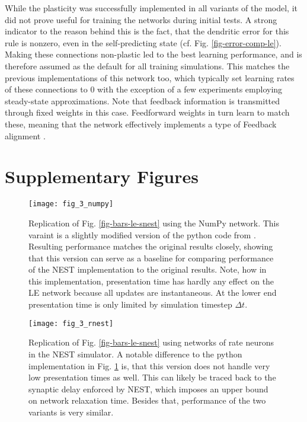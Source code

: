 While the plasticity was successfully implemented in all variants of the model, it did not prove useful for training the
networks during initial tests. A strong indicator to the reason behind this is the fact, that the dendritic error for
this rule is nonzero, even in the self-predicting state (cf. Fig. \ref{fig-error-comp-le}). Making these connections
non-plastic led to the best learning performance, and is therefore assumed as the default for all training simulations.
This matches the previous implementations of this network too, which typically set learning rates of these connections
to $0$ with the exception of a few experiments employing steady-state approximations. Note that feedback information is
transmitted through fixed weights in this case. Feedforward weights in turn learn to match these, meaning that the
network effectively implements a type of Feedback alignment \citep{Lillicrap2014}.

\newpage
\section{Supplementary Figures}


\renewcommand{\thefigure}{S\arabic{figure}}
\begin{figure}[h!]
  \centering
  \texttt{[image: fig\_3\_numpy]}
  \caption[Replication of Fig. \ref{fig-bars-le-snest} using the NumPy network]{Replication of Fig.
    \ref{fig-bars-le-snest} using the NumPy network. This varaint is a slightly modified version of the python code from
    \citep{Haider2021}. Resulting performance matches the original results closely, showing that this version can serve
    as a baseline for comparing performance of the NEST implementation to the original results. Note, how in this
    implementation, presentation time has hardly any effect on the LE network because all updates are instantaneous. At
    the lower end presentation time is only limited by simulation timestep $\Delta t$.}
  \label{fig-bars-le-numpy}
\end{figure}


\begin{figure}[h!]
  \centering
  \texttt{[image: fig\_3\_rnest]}
  \caption[Replication of Fig. \ref{fig-bars-le-snest} using networks of rate neurons in the NEST simulator]{Replication
    of Fig. \ref{fig-bars-le-snest} using networks of rate neurons in the NEST simulator. A notable difference to the
    python implementation in Fig. \ref{fig-bars-le-numpy} is, that this version does not handle very low presentation
    times as well. This can likely be traced back to the synaptic delay enforced by NEST, which imposes an upper bound
    on network relaxation time. Besides that, performance of the two variants is very similar.}
  \label{fig-bars-le-rnest}
\end{figure}



